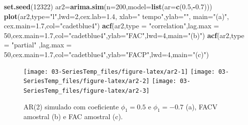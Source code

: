 \documentclass[
]{book}
\newenvironment{Shaded}{\begin{snugshade}}{\end{snugshade}}
\newcommand{\DataTypeTok}[1]{\textcolor[rgb]{0.13,0.29,0.53}{#1}}
\newcommand{\DecValTok}[1]{\textcolor[rgb]{0.00,0.00,0.81}{#1}}
\newcommand{\FloatTok}[1]{\textcolor[rgb]{0.00,0.00,0.81}{#1}}
\newcommand{\KeywordTok}[1]{\textcolor[rgb]{0.13,0.29,0.53}{\textbf{#1}}}
\newcommand{\NormalTok}[1]{#1}
\newcommand{\OperatorTok}[1]{\textcolor[rgb]{0.81,0.36,0.00}{\textbf{#1}}}
\newcommand{\StringTok}[1]{\textcolor[rgb]{0.31,0.60,0.02}{#1}}
\theoremstyle{definition}
\theoremstyle{definition}
\theoremstyle{definition}
\theoremstyle{remark}
\begin{document}
\begin{Shaded}
\begin{Highlighting}[]
\KeywordTok{set.seed}\NormalTok{(}\DecValTok{12322}\NormalTok{)}
\NormalTok{ar2=}\KeywordTok{arima.sim}\NormalTok{(}\DataTypeTok{n=}\DecValTok{200}\NormalTok{,}\DataTypeTok{model=}\KeywordTok{list}\NormalTok{(}\DataTypeTok{ar=}\KeywordTok{c}\NormalTok{(}\FloatTok{0.5}\NormalTok{,}\OperatorTok{-}\FloatTok{0.7}\NormalTok{)))}
\KeywordTok{plot}\NormalTok{(ar2,}\DataTypeTok{type=}\StringTok{"l"}\NormalTok{,}\DataTypeTok{lwd=}\DecValTok{2}\NormalTok{,}\DataTypeTok{cex.lab=}\FloatTok{1.4}\NormalTok{, }\DataTypeTok{xlab=}\StringTok{" tempo"}\NormalTok{,}\DataTypeTok{ylab=}\StringTok{""}\NormalTok{, }\DataTypeTok{main=}\StringTok{"(a)"}\NormalTok{, }\DataTypeTok{cex.main=}\FloatTok{1.7}\NormalTok{,}\DataTypeTok{col=}\StringTok{"cadetblue4"}\NormalTok{)}
\KeywordTok{acf}\NormalTok{(ar2,}\DataTypeTok{type =} \StringTok{"correlation"}\NormalTok{,}\DataTypeTok{lag.max =} \DecValTok{50}\NormalTok{,}\DataTypeTok{cex.main=}\FloatTok{1.7}\NormalTok{,}\DataTypeTok{col=}\StringTok{"cadetblue4"}\NormalTok{,}\DataTypeTok{ylab=}\StringTok{"FAC"}\NormalTok{,}\DataTypeTok{lwd=}\DecValTok{4}\NormalTok{,}\DataTypeTok{main=}\StringTok{"(b)"}\NormalTok{)}
\KeywordTok{acf}\NormalTok{(ar2,}\DataTypeTok{type =} \StringTok{"partial"}\NormalTok{ ,}\DataTypeTok{lag.max =} \DecValTok{50}\NormalTok{,}\DataTypeTok{cex.main=}\FloatTok{1.7}\NormalTok{,}\DataTypeTok{col=}\StringTok{"cadetblue4"}\NormalTok{,}\DataTypeTok{ylab=}\StringTok{"FACP"}\NormalTok{,}\DataTypeTok{lwd=}\DecValTok{4}\NormalTok{,}\DataTypeTok{main=}\StringTok{"(c)"}\NormalTok{)}
\end{Highlighting}
\end{Shaded}

\begin{figure}
\texttt{[image: 03-SeriesTemp\_files/figure-latex/ar2-1]} \texttt{[image: 03-SeriesTemp\_files/figure-latex/ar2-2]} \texttt{[image: 03-SeriesTemp\_files/figure-latex/ar2-3]} \caption{AR(2) simulado com coeficiente $\phi_1=0.5$ e $\phi_1=-0.7$  (a), FACV amostral (b) e FAC amostral (c).}\label{fig:ar2}
\end{figure}
\end{document}
